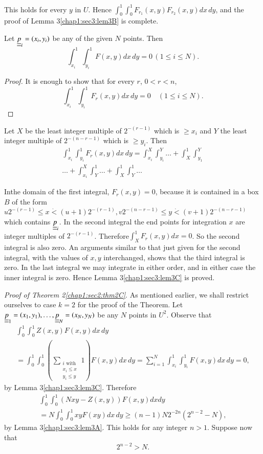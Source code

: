 This holds for every $y$ in $U$. Hence $\int_{0}^{1} \int_{0}^{1} F_{r_{1}} (x, y) F_{r_{2}} (x, y)dx \, dy$, and the proof of Lemma 3\ref{chap1:sec3:lem3B} is complete.

\begin{lemma}\label{chap1:sec3:lem3C}
Let $\underline{\underline{p}}_{i} = (x_{i}, y_{i})$ be any of the given $N$ points. Then
$$
\int_{x_{i}}^{1} \int_{y_{i}}^{1} F(x, y)dx \, dy = 0 \, (1 \leq i \leq N). 
$$
\end{lemma}

\begin{proof}
It is enough to show that for every $r$, $0<r<n$,
$$
\int_{x_{i}}^{1} \int_{y_{i}}^{1} F_{r} (x, y)dx \, dy = 0 \quad(1 \leq i \leq N).
$$
\end{proof}

Let $X$ be the least integer multiple of $2^{-(r-1)}$ which is $\geq x_{i}$ and $Y$ the least integer multiple of $2^{-(n-r-1)}$ which is $\geq y_{i}$. Then
\begin{multline*}
\int_{x_{i}}^{1} \int_{y_{i}}^{1} F_{r} (x, y)dx \, dy = \int_{x_{i}}^{X} \int_{y_{i}}^{Y} \ldots + \int_{X}^{1} \int_{y_{1}}^{Y}\\ 
\ldots + \int_{x_{i}}^{X} \int_{Y}^{1} \ldots + \int_{X}^{1} \int_{Y}^{1} \ldots
\end{multline*}

In\pageoriginale the domain of the first integral, $F_{r}(x, y) = 0$, because it is contained in a box $B$ of the form $u2^{-(r-1)} \leq x \dot{<} (u+1) 2^{-(r-1)}, v2^{-(n-r-1)} \leq y \dot{<} (v+1) 2^{-(n-r-1)}$ which contains $\underline{\underline{p}}_{i}$. In the second integral the end points for integration $x$ are integer multiples of $2^{-(r-1)}$. Therefore\break  $\int_{X}^{1} F_{r} (x, y) dx = 0$. So the second integral is also zero. An arguments similar to that just given for the second integral, with the values of $x, y$ interchanged, shows that the third integral is zero. In the last integral we may integrate in either order, and in either case the inner integral is zero. Hence Lemma 3\ref{chap1:sec3:lem3C} is proved.

\noindent \textit{ Proof of Theorem 2\ref{chap1:sec2:thm2C}}. As mentioned earlier, we shall restrict ourselves to case $k = 2$ for the proof of the Theorem. Let $\underline{\underline{p}}_{1} = (x_{1}, y_{1}), \ldots, \underline{\underline{p}}_{N} = (x_{N}, y_{N})$ be any $N$ points in $U^{2}$. Observe that
\begin{multline*}
\int_{0}^{1} \int_{0}^{1} Z(x, y) F(x, y)dx \, dy\\
 = \int_{0}^{1} \int_{0}^{1} \left(\sum_{\substack{i \text { with }\\x_{i} \leq x\\y_{i} \leq y}}1\right)F(x, y)dx \, dy = \sum_{i=1}^{N} \int_{x_{i}}^{1} \int_{y_{i}}^{1} F(x, y)dx\, dy = 0,
\end{multline*}
by Lemma 3\ref{chap1:sec3:lem3C}. Therefore
\begin{multline*}
\int_{0}^{1} \int_{0}^{1} (N xy -Z(x, y)) F(x, y)dx dy\\
 = N \int_{0}^{1} \int_{0}^{1} xy F(xy) dx \, dy \geq (n-1)N 2^{-2n} (2^{n-2} - N),
\end{multline*}
by Lemma 3\ref{chap1:sec3:lem3A}. This holds for any integer $n > 1$. Suppose now that
$$
2^{n-2} > N.
$$

